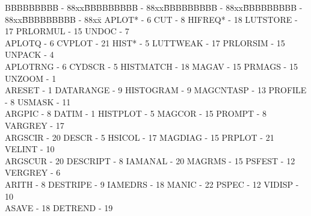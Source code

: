 {\begin{tabbing}
BBBBBBBBB - 88xx\=BBBBBBBBB - 88xx\=BBBBBBBBB - 88xx\=BBBBBBBBB - 88xx\=BBBBBBBBB - 88xx\=\kill
 APLOT* - 6                              \>CUT - 8                               
   \>HIFREQ* - 18                            \>
 LUTSTORE - 17                           \>PRLORMUL - 15                         
   \>UNDOC - 7                               \\
 APLOTQ - 6                              \>CVPLOT - 21                           
   \>HIST* - 5                               \>
 LUTTWEAK - 17                           \>PRLORSIM - 15                         
   \>UNPACK - 4                              \\
 APLOTRNG - 6                            \>CYDSCR - 5                            
   \>HISTMATCH - 18                          \>
 MAGAV - 15                              \>PRMAGS - 15                           
   \>UNZOOM - 1                              \\
 ARESET - 1                              \>DATARANGE - 9                         
   \>HISTOGRAM - 9                           \>
 MAGCNTASP - 13                          \>PROFILE - 8                           
   \>USMASK - 11                             \\
 ARGPIC - 8                              \>DATIM - 1                             
   \>HISTPLOT - 5                            \>
 MAGCOR - 15                             \>PROMPT - 8                            
   \>VARGREY - 17                            \\
 ARGSCIR - 20                            \>DESCR - 5                             
   \>HSICOL - 17                             \>
 MAGDIAG - 15                            \>PRPLOT - 21                           
   \>VELINT - 10                             \\
 ARGSCUR - 20                            \>DESCRIPT - 8                          
   \>IAMANAL - 20                            \>
 MAGRMS - 15                             \>PSFEST - 12                           
   \>VERGREY - 6                             \\
 ARITH - 8                               \>DESTRIPE - 9                          
   \>IAMEDRS - 18                            \>
 MANIC - 22                              \>PSPEC - 12                            
   \>VIDISP - 10                             \\
 ASAVE - 18                              \>DETREND - 19                          

\end{tabbing}}
